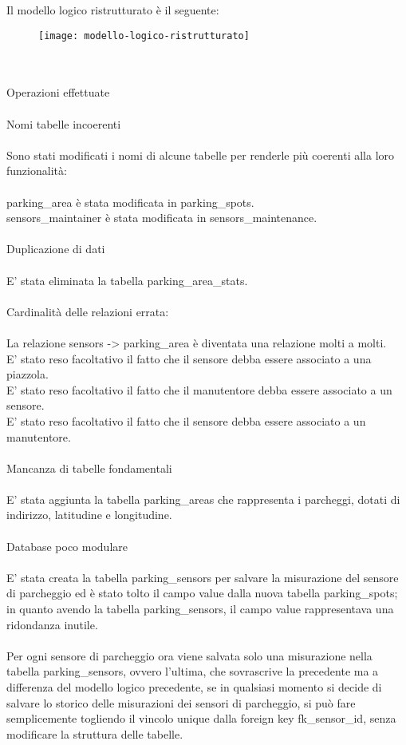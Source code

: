 Il modello logico ristrutturato è il seguente:
\begin{figure}[!h]
  \centering
  \texttt{[image: modello-logico-ristrutturato]}
\end{figure}
\\\\
Operazioni effettuate
\\\\
Nomi tabelle incoerenti
\\\\
Sono stati modificati i nomi di alcune tabelle per renderle più coerenti alla loro funzionalità:
\\\\
parking\_area è stata modificata in parking\_spots.
\\
sensors\_maintainer è stata modificata in sensors\_maintenance.
\\\\
Duplicazione di dati
\\\\
E' stata eliminata la tabella parking\_area\_stats.
\\\\
Cardinalità delle relazioni errata:
\\\\
La relazione sensors -> parking\_area è diventata una relazione molti a molti.
\\
E' stato reso facoltativo il fatto che il sensore debba essere associato a una piazzola.
\\
E' stato reso facoltativo il fatto che il manutentore debba essere associato a un sensore.
\\
E' stato reso facoltativo il fatto che il sensore debba essere associato a un manutentore.
\\\\
Mancanza di tabelle fondamentali
\\\\
E' stata aggiunta la tabella parking\_areas che rappresenta i parcheggi, dotati di indirizzo, latitudine e 
longitudine.
\\\\
Database poco modulare
\\\\
E' stata creata la tabella parking\_sensors per salvare la misurazione del sensore di parcheggio ed è
stato tolto il campo value dalla nuova tabella parking\_spots; in quanto avendo la tabella parking\_sensors,
il campo value rappresentava una ridondanza inutile.
\\\\
Per ogni sensore di parcheggio ora viene salvata solo una misurazione nella tabella parking\_sensors, ovvero
l'ultima, che sovrascrive la precedente ma a differenza del modello logico precedente, se in qualsiasi momento
si decide di salvare lo storico delle misurazioni dei sensori di parcheggio, si può fare semplicemente togliendo
il vincolo unique dalla foreign key fk\_sensor\_id, senza modificare la struttura delle tabelle.